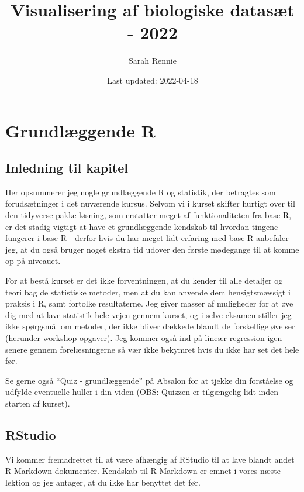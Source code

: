 \documentclass[
]{book}
\title{Visualisering af biologiske datasæt - 2022}
\author{Sarah Rennie}
\date{Last updated: 2022-04-18}
\begin{document}
\maketitle

{
\setcounter{tocdepth}{1}
\tableofcontents
}
\hypertarget{basics}{%
\chapter{Grundlæggende R}\label{basics}}

\hypertarget{inledning-til-kapitel}{%
\section{Inledning til kapitel}\label{inledning-til-kapitel}}

Her opsummerer jeg nogle grundlæggende R og statistik, der betragtes som forudsætninger i det nuværende kursus. Selvom vi i kurset skifter hurtigt over til den tidyverse-pakke løsning, som erstatter meget af funktionaliteten fra base-R, er det stadig vigtigt at have et grundlæggende kendskab til hvordan tingene fungerer i base-R - derfor hvis du har meget lidt erfaring med base-R anbefaler jeg, at du også bruger noget ekstra tid udover den første mødegange til at komme op på niveauet.

For at bestå kurset er det ikke forventningen, at du kender til alle detaljer og teori bag de statistiske metoder, men at du kan anvende dem hensigtsmæssigt i praksis i R, samt fortolke resultaterne. Jeg giver masser af muligheder for at øve dig med at lave statistik hele vejen gennem kurset, og i selve eksamen stiller jeg ikke spørgsmål om metoder, der ikke bliver dækkede blandt de forskellige øvelser (herunder workshop opgaver). Jeg kommer også ind på lineær regression igen senere gennem forelæsningerne så vær ikke bekymret hvis du ikke har set det hele før.

Se gerne også ``Quiz - grundlæggende'' på Absalon for at tjekke din forståelse og udfylde eventuelle huller i din viden (OBS: Quizzen er tilgængelig lidt inden starten af kurset).

\hypertarget{rstudio}{%
\section{RStudio}\label{rstudio}}

Vi kommer fremadrettet til at være afhængig af RStudio til at lave blandt andet R Markdown dokumenter. Kendskab til R Markdown er emnet i vores næste lektion og jeg antager, at du ikke har benyttet det før.
\end{document}
